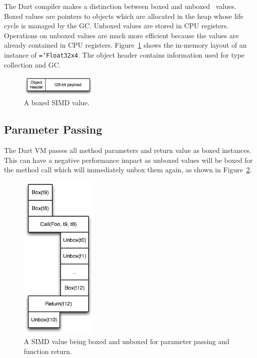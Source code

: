 \documentclass[preprint]{sigplanconf}
\newcommand{\ttt}[1]{{\texttt{\hyphenchar\font=`\-\relax #1}}}%
\begin{document}
The Dart compiler makes a distinction between boxed and unboxed~\cite{unboxing}
values. Boxed values are pointers to objects which are allocated in the heap
whose life cycle is managed by the GC. Unboxed values are stored in CPU
registers. Operations on unboxed values are much more efficient because the
values are already contained in CPU registers. Figure~\ref{fig:boxedobject}
shows the in-memory layout of an instance of \ttt{Float32x4}. The object header
contains information used for type collection and GC.

\begin{figure}
\begin{center}
\includegraphics[width=0.33\textwidth]{figures/boxedobject.eps}
\end{center}
\caption{A boxed SIMD value.}
\label{fig:boxedobject}
\end{figure}

\subsection{Parameter Passing}

The Dart VM passes all method parameters and return value as boxed
instances. This can have a negative performance impact as unboxed values will be
boxed for the method call which will immediately unbox them again, as shown in
Figure~\ref{fig:boxunboxbox}.

\begin{figure}
\begin{center}
\includegraphics[width=0.33\textwidth]{figures/boxunboxbox.eps}
\end{center}
\caption{A SIMD value being boxed and unboxed for parameter passing and
function return.}
\label{fig:boxunboxbox}
\end{figure}
\end{document}
